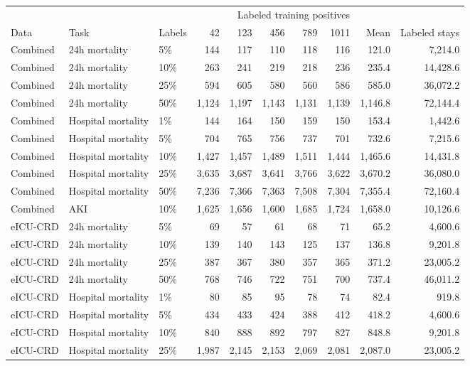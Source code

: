 \begin{tabular}{lllrrrrrrr}
\toprule
 & & & \multicolumn{6}{c}{Labeled training positives} & \\
\cmidrule(lr){4-9}
Data & Task & Labels & 42 & 123 & 456 & 789 & 1011 & Mean & Labeled stays \\
\midrule
Combined & 24h mortality & 5\% & 144 & 117 & 110 & 118 & 116 & 121.0 & 7,214.0 \\
Combined & 24h mortality & 10\% & 263 & 241 & 219 & 218 & 236 & 235.4 & 14,428.6 \\
Combined & 24h mortality & 25\% & 594 & 605 & 580 & 560 & 586 & 585.0 & 36,072.2 \\
Combined & 24h mortality & 50\% & 1,124 & 1,197 & 1,143 & 1,131 & 1,139 & 1,146.8 & 72,144.4 \\
Combined & Hospital mortality & 1\% & 144 & 164 & 150 & 159 & 150 & 153.4 & 1,442.6 \\
Combined & Hospital mortality & 5\% & 704 & 765 & 756 & 737 & 701 & 732.6 & 7,215.6 \\
Combined & Hospital mortality & 10\% & 1,427 & 1,457 & 1,489 & 1,511 & 1,444 & 1,465.6 & 14,431.8 \\
Combined & Hospital mortality & 25\% & 3,635 & 3,687 & 3,641 & 3,766 & 3,622 & 3,670.2 & 36,080.0 \\
Combined & Hospital mortality & 50\% & 7,236 & 7,366 & 7,363 & 7,508 & 7,304 & 7,355.4 & 72,160.4 \\
Combined & AKI & 10\% & 1,625 & 1,656 & 1,600 & 1,685 & 1,724 & 1,658.0 & 10,126.6 \\
eICU-CRD & 24h mortality & 5\% & 69 & 57 & 61 & 68 & 71 & 65.2 & 4,600.6 \\
eICU-CRD & 24h mortality & 10\% & 139 & 140 & 143 & 125 & 137 & 136.8 & 9,201.8 \\
eICU-CRD & 24h mortality & 25\% & 387 & 367 & 380 & 357 & 365 & 371.2 & 23,005.2 \\
eICU-CRD & 24h mortality & 50\% & 768 & 746 & 722 & 751 & 700 & 737.4 & 46,011.2 \\
eICU-CRD & Hospital mortality & 1\% & 80 & 85 & 95 & 78 & 74 & 82.4 & 919.8 \\
eICU-CRD & Hospital mortality & 5\% & 434 & 433 & 424 & 388 & 412 & 418.2 & 4,600.6 \\
eICU-CRD & Hospital mortality & 10\% & 840 & 888 & 892 & 797 & 827 & 848.8 & 9,201.8 \\
eICU-CRD & Hospital mortality & 25\% & 1,987 & 2,145 & 2,153 & 2,069 & 2,081 & 2,087.0 & 23,005.2 \\

\end{tabular}

